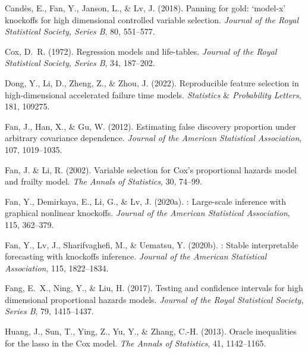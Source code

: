 \documentclass[11pt]{article}
\begin{document}
\begin{thebibliography}{}
	Cand{\`e}s, E., Fan, Y., Janson, L., \& Lv, J. (2018).
	\newblock Panning for gold: ‘model-x’ knockoffs for high dimensional
	controlled variable selection.
	\newblock \textit{Journal of the Royal Statistical Society, Series B},
	80, 551--577.
	
	Cox, D.~R. (1972).
	\newblock Regression models and life-tables.
	\newblock \textit{Journal of the Royal Statistical Society, Series B},
	34, 187--202.
	
	Dong, Y., Li, D., Zheng, Z., \& Zhou, J. (2022).
	\newblock Reproducible feature selection in high-dimensional accelerated
	failure time models.
	\newblock \textit{Statistics $\&$ Probability Letters}, 181, 109275.
	
	Fan, J., Han, X., \& Gu, W. (2012).
	\newblock Estimating false discovery proportion under arbitrary covariance
	dependence.
	\newblock \textit{Journal of the American Statistical Association},
	107, 1019--1035.
	
	Fan, J. \& Li, R. (2002).
	\newblock Variable selection for {Cox's} proportional hazards model and frailty
	model.
	\newblock \textit{The Annals of Statistics}, 30, 74--99.
	
	Fan, Y., Demirkaya, E., Li, G., \& Lv, J. (2020a).
	: Large-scale inference with graphical nonlinear knockoffs.
	\newblock \textit{Journal of the American Statistical Association}, 115, 362--379.
	
	Fan, Y., Lv, J., Sharifvaghefi, M., \& Uematsu, Y. (2020b).
	: Stable interpretable forecasting with knockoffs inference.
	\newblock \textit{Journal of the American Statistical Association},
	115, 1822--1834.
	
	Fang, E.~X., Ning, Y., \& Liu, H. (2017).
	\newblock Testing and confidence intervals for high dimensional proportional
	hazards models.
	\newblock \textit{Journal of the Royal Statistical Society, Series B},
	79, 1415--1437.
	
	Huang, J., Sun, T., Ying, Z., Yu, Y., \& Zhang, C.-H. (2013).
	\newblock Oracle inequalities for the lasso in the {Cox} model.
	\newblock \textit{The Annals of Statistics}, 41, 1142--1165.
	

\end{thebibliography}
\end{document}
